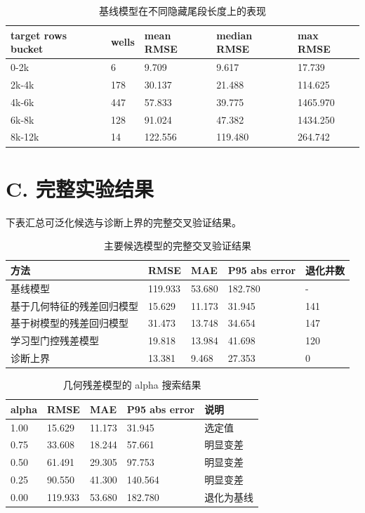 \documentclass[openany]{Template_ECNU_Undergraduate_202505/ecnuundergraduate}
\newcommand{\appendixreset}[1]{%
  \setcounter{table}{0}%
  \setcounter{figure}{0}%
  \renewcommand{\thetable}{#1-\arabic{table}}%
  \renewcommand{\thefigure}{#1-\arabic{figure}}%
}
\begin{document}
\begin{table}[H]
\centering
\small
\begin{tabular}{@{}p{3.4cm}p{1.8cm}p{2.0cm}p{2.0cm}p{2.0cm}@{}}
\toprule
target rows bucket & wells & mean RMSE & median RMSE & max RMSE \\
\midrule
0-2k & 6 & 9.709 & 9.617 & 17.739 \\
2k-4k & 178 & 30.137 & 21.488 & 114.625 \\
4k-6k & 447 & 57.833 & 39.775 & 1465.970 \\
6k-8k & 128 & 91.024 & 47.382 & 1434.250 \\
8k-12k & 14 & 122.556 & 119.480 & 264.742 \\
\bottomrule
\end{tabular}
\caption{基线模型在不同隐藏尾段长度上的表现}
\end{table}

\section*{C. 完整实验结果}
\appendixreset{C}
\noindent 下表汇总可泛化候选与诊断上界的完整交叉验证结果。

\begin{table}[H]
\centering
\small
\begin{tabular}{@{}p{4.7cm}p{1.8cm}p{1.8cm}p{2.0cm}p{2.0cm}@{}}
\toprule
方法 & RMSE & MAE & P95 abs error & 退化井数 \\
\midrule
基线模型 & 119.933 & 53.680 & 182.780 & - \\
基于几何特征的残差回归模型 & 15.629 & 11.173 & 31.945 & 141 \\
基于树模型的残差回归模型 & 31.473 & 13.748 & 34.654 & 147 \\
学习型门控残差模型 & 19.818 & 13.984 & 41.698 & 120 \\
诊断上界 & 13.381 & 9.468 & 27.353 & 0 \\
\bottomrule
\end{tabular}
\caption{主要候选模型的完整交叉验证结果}
\end{table}

\begin{table}[H]
\centering
\small
\begin{tabular}{@{}p{2.0cm}p{2.0cm}p{2.0cm}p{2.0cm}p{2.2cm}@{}}
\toprule
alpha & RMSE & MAE & P95 abs error & 说明 \\
\midrule
1.00 & 15.629 & 11.173 & 31.945 & 选定值 \\
0.75 & 33.608 & 18.244 & 57.661 & 明显变差 \\
0.50 & 61.491 & 29.305 & 97.753 & 明显变差 \\
0.25 & 90.550 & 41.300 & 140.564 & 明显变差 \\
0.00 & 119.933 & 53.680 & 182.780 & 退化为基线 \\
\bottomrule
\end{tabular}
\caption{几何残差模型的 alpha 搜索结果}
\end{table}
\end{document}
